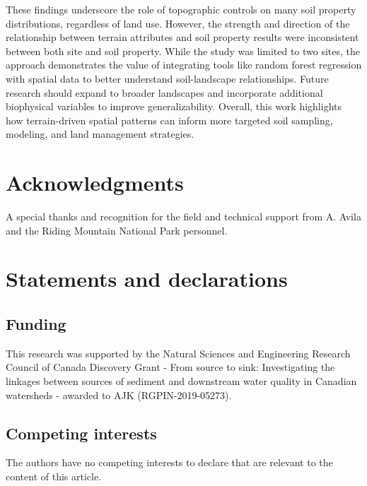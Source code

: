 \documentclass[
  number]{elsarticle}
\begin{document}
These findings underscore the role of topographic controls on many soil
property distributions, regardless of land use. However, the strength
and direction of the relationship between terrain attributes and soil
property results were inconsistent between both site and soil property.
While the study was limited to two sites, the approach demonstrates the
value of integrating tools like random forest regression with spatial
data to better understand soil-landscape relationships. Future research
should expand to broader landscapes and incorporate additional
biophysical variables to improve generalizability. Overall, this work
highlights how terrain-driven spatial patterns can inform more targeted
soil sampling, modeling, and land management strategies.

\section*{Acknowledgments}\label{acknowledgments}

A special thanks and recognition for the field and technical support
from A. Avila and the Riding Mountain National Park personnel.

\section*{Statements and
declarations}\label{statements-and-declarations}

\subsection*{Funding}\label{funding}

This research was supported by the Natural Sciences and Engineering
Research Council of Canada Discovery Grant - From source to sink:
Investigating the linkages between sources of sediment and downstream
water quality in Canadian watersheds - awarded to AJK
(RGPIN-2019-05273).

\subsection*{Competing interests}\label{competing-interests}

The authors have no competing interests to declare that are relevant to
the content of this article.
\end{document}
